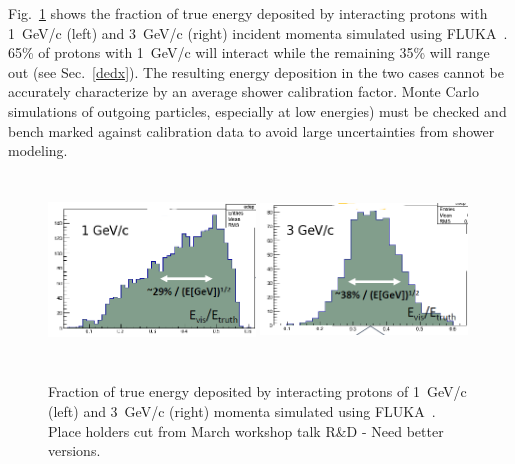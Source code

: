 Fig.~\ref{fig:hadronshwr} shows the fraction of true energy deposited by interacting protons with 1~GeV/c (left) and
3~GeV/c (right) incident momenta simulated using FLUKA~\cite{fluka}. 65\% of protons with 1~GeV/c will interact while the remaining 
35\% will range out (see Sec.~\ref{dedx}). The resulting energy deposition in the two cases cannot be 
accurately characterize by an average shower calibration factor. Monte Carlo simulations of 
outgoing particles, especially at low energies) must be checked and bench marked against calibration data to avoid
large uncertainties from shower modeling. 
\begin{figure}[h!]
  \centering
\includegraphics[width=0.49\textwidth,height=5.0cm]{figures/protons_1gev_v0}
\includegraphics[width=0.49\textwidth,height=5.0cm]{figures/protons_3gev_v0}
\label{fig:hadronshwr}
  \caption{Fraction of true energy deposited by interacting protons of 1~GeV/c (left) and
3~GeV/c (right) momenta simulated using FLUKA~\cite{fluka}.
{\color{red}
Place holders cut from March workshop talk R\&D - Need better versions.
}
}
\end{figure}

